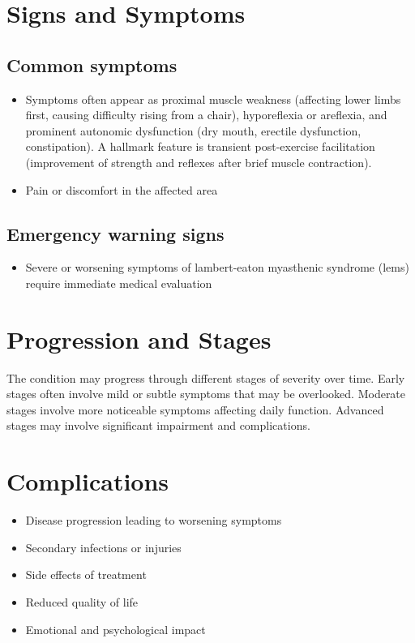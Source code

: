 \section{Signs and Symptoms}

\subsection{Common symptoms}
\begin{itemize}[noitemsep]
  \item Symptoms often appear as proximal muscle weakness (affecting lower limbs first, causing difficulty rising from a chair), hyporeflexia or areflexia, and prominent autonomic dysfunction (dry mouth, erectile dysfunction, constipation). A hallmark feature is transient post-exercise facilitation (improvement of strength and reflexes after brief muscle contraction).

  \item Pain or discomfort in the affected area
  \end{itemize}

\subsection{Emergency warning signs}
\begin{itemize}[noitemsep]
  \item Severe or worsening symptoms of lambert-eaton myasthenic syndrome (lems) require immediate medical evaluation
\end{itemize}
\section{Progression and Stages}
The condition may progress through different stages of severity over time. Early stages often involve mild or subtle symptoms that may be overlooked. Moderate stages involve more noticeable symptoms affecting daily function. Advanced stages may involve significant impairment and complications.
\section{Complications}
\begin{itemize}[noitemsep]
  \item Disease progression leading to worsening symptoms
  \item Secondary infections or injuries
  \item Side effects of treatment
  \item Reduced quality of life
  \item Emotional and psychological impact
\end{itemize}
